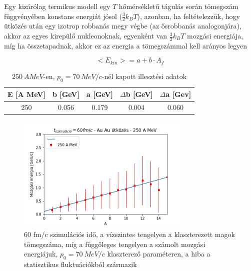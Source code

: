 \documentclass[a4paper,12pt]{article}
\begin{document}
\vspace{5mm}

\par Egy kizárólag termikus modell egy $T$ hőmérsékletű tágulás során tömegszám függvényében konstans energiát jósol ($\frac{3}{2}k_{B}T$), azonban, ha feltételezzük, hogy ütközés után egy izotrop robbanás megy végbe (az ősrobbanás analogonjára), akkor az egyes kirepülő nukleonoknak, egyenként van $\frac{3}{2}k_{B}T$ mozgási energiája, míg ha összetapadnak, akkor ez az energia a tömegszámmal kell arányos legyen

\vspace{5mm}

\begin{equation}
\big<E_{kin}\big> = a + b\cdot A_{f}
\label{blast-model}
\end{equation}

\vspace{5mm}

\begin{table}
\centering
\begin{tabular}{|c|c|c|c|c|}
\hline
E [A MeV] & b [GeV] & a [GeV] & $\Delta$b [GeV] & $\Delta$a [Gev] \\
\hline
250 & 0.056 & 0.179 & 0.004 & 0.060 \\
\hline
\end{tabular}
\caption{$250 ~AMeV$-en, $p_{0} = 70 ~MeV/c$-nél kapott illesztési adatok}
\end{table}

\vspace{5mm}

\begin{figure}[H]
\centering
\includegraphics[width=0.75\textwidth]{./60fmcAuAu250AMeV007mom.png}
\caption{60 fm/c szimulációs idő, a vízszintes tengelyen a klaszterezett magok tömegszáma, míg a függőleges tengelyen a számolt mozgási energiájuk, $p_{0} = 70 ~MeV/c$ klaszterező paraméteren, a hiba a statisztikus fluktuációkból származik}
\end{figure}
\end{document}
